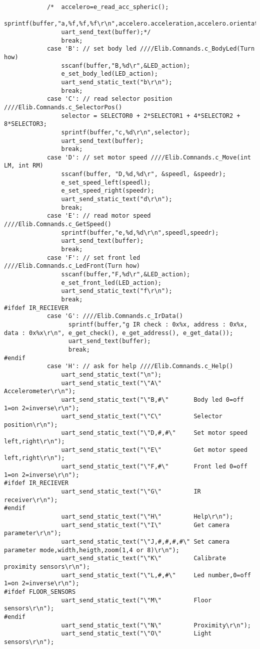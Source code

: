 \begin{lstlisting}
			/*	accelero=e_read_acc_spheric();
				sprintf(buffer,"a,%f,%f,%f\r\n",accelero.acceleration,accelero.orientation,accelero.inclination);				
				uart_send_text(buffer);*/
				break;
			case 'B': // set body led ////Elib.Comnands.c_BodyLed(Turn how)
				sscanf(buffer,"B,%d\r",&LED_action);
			 	e_set_body_led(LED_action);
				uart_send_static_text("b\r\n");
				break;
			case 'C': // read selector position ////Elib.Comnands.c_SelectorPos()
				selector = SELECTOR0 + 2*SELECTOR1 + 4*SELECTOR2 + 8*SELECTOR3;
				sprintf(buffer,"c,%d\r\n",selector);
				uart_send_text(buffer);
				break;
			case 'D': // set motor speed ////Elib.Comnands.c_Move(int LM, int RM)
				sscanf(buffer, "D,%d,%d\r", &speedl, &speedr);
				e_set_speed_left(speedl);
				e_set_speed_right(speedr);
				uart_send_static_text("d\r\n");
				break;
			case 'E': // read motor speed ////Elib.Comnands.c_GetSpeed()
				sprintf(buffer,"e,%d,%d\r\n",speedl,speedr);
				uart_send_text(buffer);
				break; 
			case 'F': // set front led ////Elib.Comnands.c_LedFront(Turn how)
				sscanf(buffer,"F,%d\r",&LED_action);
				e_set_front_led(LED_action);
				uart_send_static_text("f\r\n");
				break;
#ifdef IR_RECIEVER				
			case 'G': ////Elib.Comnands.c_IrData()
                  sprintf(buffer,"g IR check : 0x%x, address : 0x%x, data : 0x%x\r\n", e_get_check(), e_get_address(), e_get_data());
                  uart_send_text(buffer);
                  break;
#endif
			case 'H': // ask for help ////Elib.Comnands.c_Help()
				uart_send_static_text("\n");
				uart_send_static_text("\"A\"         Accelerometer\r\n");
				uart_send_static_text("\"B,#\"       Body led 0=off 1=on 2=inverse\r\n");
				uart_send_static_text("\"C\"         Selector position\r\n");
				uart_send_static_text("\"D,#,#\"     Set motor speed left,right\r\n");
				uart_send_static_text("\"E\"         Get motor speed left,right\r\n");
				uart_send_static_text("\"F,#\"       Front led 0=off 1=on 2=inverse\r\n");
#ifdef IR_RECIEVER
				uart_send_static_text("\"G\"         IR receiver\r\n");
#endif
				uart_send_static_text("\"H\"	     Help\r\n");
				uart_send_static_text("\"I\"         Get camera parameter\r\n");
				uart_send_static_text("\"J,#,#,#,#\" Set camera parameter mode,width,heigth,zoom(1,4 or 8)\r\n");
				uart_send_static_text("\"K\"         Calibrate proximity sensors\r\n");
				uart_send_static_text("\"L,#,#\"     Led number,0=off 1=on 2=inverse\r\n");
#ifdef FLOOR_SENSORS
				uart_send_static_text("\"M\"         Floor sensors\r\n");
#endif
				uart_send_static_text("\"N\"         Proximity\r\n");
				uart_send_static_text("\"O\"         Light sensors\r\n");

\end{lstlisting}
